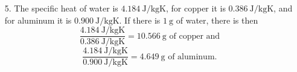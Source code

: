 \documentclass[fleqn]{article}[12pt]
\begin{document}
\begin{enumerate}
    \item[5.] The specific heat of water is $\SI{4.184}{\joule/\kg\kelvin}$, for copper it is $\SI{0.386}{\joule/\kg\kelvin}$, and for aluminum it is $\SI{0.900}{\joule/\kg\kelvin}$. If there is $\SI{1}{\gram}$ of water, there is then
    \begin{equation*}
        \frac{\SI{4.184}{\joule/\kg\kelvin}}{\SI{0.386}{\joule/\kg\kelvin}} = \SI{10.566}{\gram} \text{ of copper and}
    \end{equation*}
    \begin{equation*}
        \frac{\SI{4.184}{\joule/\kg\kelvin}}{\SI{0.900}{\joule/\kg\kelvin}} = \SI{4.649}{\gram} \text{ of aluminum.}
    \end{equation*}


\end{enumerate}
\end{document}
